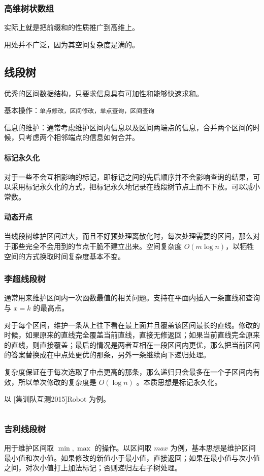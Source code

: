 \documentclass[UTF-8]{ctexart}
\newcommand{\cpp}[1]{\inputminted[bgcolor=bg,breaklines,breakanywhere=true]{c++}{#1}}
\begin{document}
			\subsubsection{高维树状数组}
			实际上就是把前缀和的性质推广到高维上。
	
			用处并不广泛，因为其空间复杂度是满的。
		\subsection{线段树}
		优秀的区间数据结构，只要求信息具有可加性和能够快速求和。
	
		基本操作：\texttt{单点修改，区间修改，单点查询，区间查询}
	
		信息的维护：通常考虑维护区间内信息以及区间两端点的信息，合并两个区间的时候，只考虑两个相邻端点的信息如何合并。
		\paragraph{标记永久化} 对于一些不会互相影响的标记，即标记之间的先后顺序并不会影响查询的结果，可以采用标记永久化的方式，把标记永久地记录在线段树节点上而不下放。可以减小常数。
	
		\paragraph{动态开点} 当线段树维护区间过大，而且不好预处理离散化时，每次处理需要的区间，那么对于那些完全不会用到的节点干脆不建立出来。空间复杂度 $O(m \log n)$，以牺牲空间的方式换取时间复杂度基本不变。
			\subsubsection{李超线段树}
			通常用来维护区间内一次函数最值的相关问题。支持在平面内插入一条直线和查询与 $x=k$ 的最高点。
	
			对于每个区间，维护一条从上往下看在最上面并且覆盖该区间最长的直线。修改的时候，如果原来的直线完全覆盖当前直线，直接无修返回；如果当前直线完全原来的直线，则直接覆盖；最后的情况是两者互相在一段区间内更优，那么把当前区间的答案替换成在中点处更优的那条，另外一条继续向下递归处理。
	
			复杂度保证在于每次选取了中点更高的那条，那么递归只会最多在一个子区间内有效，所以单次修改的复杂度是 $O(\log n)$ 。本质思想是标记永久化。
		
			以 [集训队互测2015]Robot 为例。
			\cpp{code/Example/BZOJ3938.cpp}
			\subsubsection{吉利线段树}
			用于维护区间取 $\min,\max$ 的操作。以区间取 $max$ 为例，基本思想是维护区间最小值和次小值。如果修改的新值小于最小值，直接返回；如果在最小值与次小值之间，对次小值打上加法标记；否则递归左右子树处理。
	
\end{document}

